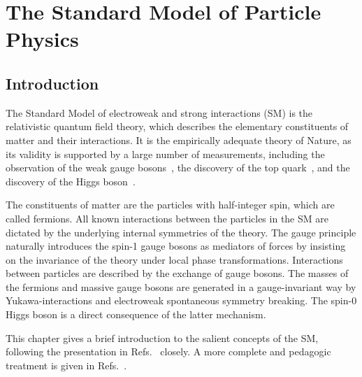 %
\chapter{The Standard Model of Particle Physics}
\label{sec:sm}



\section{Introduction}
\label{sec:sm:introduction}
The Standard Model of electroweak and strong interactions (SM) is the relativistic quantum field theory, which describes the elementary constituents of matter and their interactions. It is the empirically adequate theory of Nature, as its validity is supported by a large number of measurements, including the observation of the weak gauge bosons~\cite{Arnison1983,Banner1983,Arnison1983-2,Bagnaia1983}, the discovery of the top quark~\cite{Abachi1995,Abe1995}, and the discovery of the Higgs boson~\cite{HIGG-2012-27,CMS-HIG-12-028}.

The constituents of matter are the particles with half-integer spin, which are called fermions. All known interactions between the particles in the SM are dictated by the underlying internal symmetries of the theory. The gauge principle naturally introduces the spin-1 gauge bosons as mediators of forces by insisting on the invariance of the theory under local phase transformations. Interactions between particles are described by the exchange of gauge bosons. The masses of the fermions and massive gauge bosons are generated in a gauge-invariant way by Yukawa-interactions and electroweak spontaneous symmetry breaking. The spin-0 Higgs boson is a direct consequence of the latter mechanism.

This chapter gives a brief introduction to the salient concepts of the SM, following the presentation in Refs.~\cite{Hollik2010,Halzen1984} closely. A more complete and pedagogic treatment is given in Refs.~\cite{Maggiore2005,Peskin1995,Schwartz2013}.

\newpage

